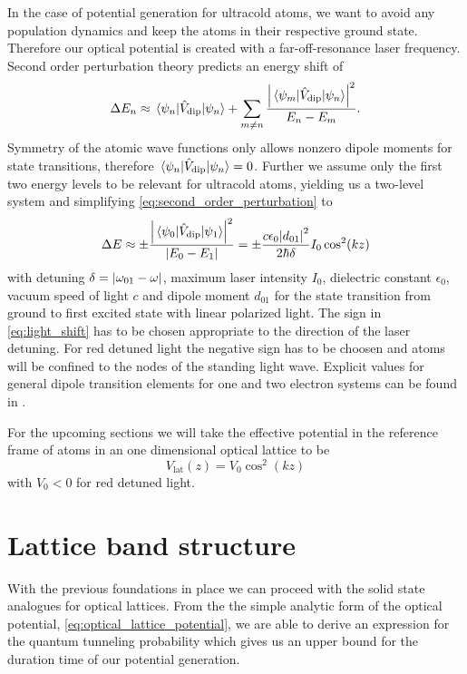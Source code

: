 In the case of potential generation for ultracold atoms, we want to avoid any
population dynamics and keep the atoms in their respective ground state.
Therefore our optical potential is created with a far-off-resonance laser
frequency. Second order perturbation theory predicts an energy shift of
\begin{equation}
  \Delta E_n
  \approx
  \mel{\psi_n}{\hat{V}_\text{dip}}{\psi_n}
  +
  \sum_{m\neq n}\frac{\abs{\mel{\psi_m}{\hat{V}_\text{dip}}{\psi_n}}^2}{E_n-E_m}
  \label{eq:second_order_perturbation}.
\end{equation}
Symmetry of the atomic wave functions only allows nonzero dipole moments for
state transitions, therefore $\mel{\psi_n}{\hat{V}_\text{dip}}{\psi_n}=0$.
Further we assume only the first two energy levels to be relevant for
ultracold atoms, yielding us a two-level system and simplifying
\cref{eq:second_order_perturbation} to
\begin{equation}
  \Delta E
  \approx
  \pm\frac{\abs{\mel{\psi_0}{\hat{V}_\text{dip}}{\psi_1}}^2}{\abs{E_0-E_1}}
  =
  \pm\frac{c\epsilon_0 \abs{d_{01}}^2}{2\hbar\delta}I_0\cos^2(kz)
  \label{eq:light_shift}
\end{equation}
with detuning $\delta=\abs{\omega_{01}-\omega}$, maximum laser intensity
$I_0$, dielectric constant $\epsilon_0$, vacuum speed of light $c$ and dipole
moment $d_{01}$ for the state transition from ground to first excited state
with linear polarized light. The sign in \cref{eq:light_shift} has to be
chosen appropriate to the direction of the laser detuning. For red detuned
light the negative sign has to be choosen and atoms will be confined to the
nodes of the standing light wave. Explicit values for general dipole
transition elements for one and two electron systems can be found in
\cite{Bethe1957}.

For the upcoming sections we will take the effective potential in the reference
frame of atoms in an one dimensional optical lattice to be
\begin{equation}
  V_\text{lat}(z)=V_0\cos^2(kz)
  \label{eq:optical_lattice_potential}
\end{equation}
with $V_0<0$ for red detuned light.

\section{Lattice band structure}

With the previous foundations in place we can proceed with the solid state
analogues for optical lattices. From the  the simple analytic form of the
optical potential, \cref{eq:optical_lattice_potential}, we are able to
derive an expression for the quantum tunneling probability which gives us
an upper bound for the duration time of our potential generation.

